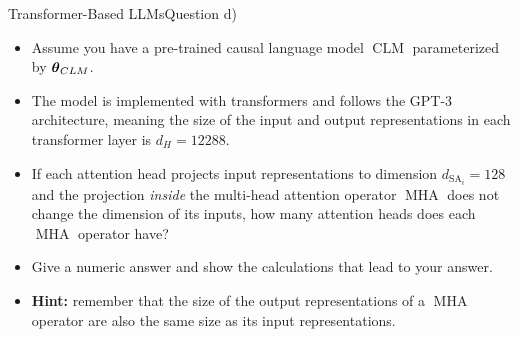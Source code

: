 \documentclass[t]{beamer}
\newcommand\op[1]{\operatorname{#1}}
\begin{document}
\begin{frame}{Transformer-Based LLMs}{Question d)}
    \begin{itemize}
        \item Assume you have a pre-trained causal language model $\op{CLM}$
              parameterized by ${\boldsymbol{\theta}}_{CLM}$.
        \item The model is implemented with transformers and follows the GPT-3
              architecture, meaning the size of the input and output
              representations in each transformer layer is $d_H = 12288$.
        \item If each attention head projects input representations to dimension
              $d_{\op{SA}_i} = 128$ and the projection \emph{inside} the
              multi-head attention operator $\op{MHA}$ does not change the
              dimension of its inputs, how many attention heads does each
              $\op{MHA}$ operator have?
        \item Give a numeric answer and show the calculations that lead to your
              answer.
        \item \textbf{Hint:} remember that the size of the output
              representations of a $\op{MHA}$ operator are also the same size as
              its input representations.
    \end{itemize}
\end{frame}
\end{document}
